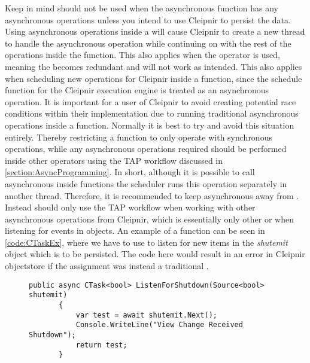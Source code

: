 Keep in mind  should not be used when the asynchronous function has any asynchronous operations unless you intend to use Cleipnir to persist the data. Using asynchronous operations inside a  will cause Cleipnir to create a new thread to handle the asynchronous operation while continuing on with the rest of the operations inside the function. This also applies when the  operator is used, meaning the  becomes redundant and will not work as intended. This also applies when scheduling new operations for Cleipnir inside a  function, since the schedule function for the Cleipnir execution engine is treated as an asynchronous operation. It is important for a user of Cleipnir to avoid creating potential race conditions within their implementation due to running traditional asynchronous operations inside a  function. Normally it is best to try and avoid this situation entirely. Thereby restricting a  function to only operate with synchronous operations, while any asynchronous operations required should be performed inside other  operators using the TAP workflow discussed in \autoref{section:AsyncProgramming}. In short, although it is possible to call asynchronous  inside  functions the scheduler runs this operation separately in another thread. Therefore, it is recommended to keep asynchronous  away from . Instead  should only use the TAP workflow when working with other asynchronous operations from Cleipnir, which is essentially only other  or when listening for events in  objects. An example of a  function can be seen in \autoref{code:CTaskEx}, where we have to use  to listen for new items in the \emph{shutemit}  object which is to be persisted. The code here would result in an error in Cleipnir objectstore if the  assignment was instead a traditional .

\begin{figure}[h]
	\centering
	\begin{lstlisting}[label = code:CTaskEx, caption= Example of a CTask function, captionpos = b, basicstyle=\scriptsize]
	public async CTask<bool> ListenForShutdown(Source<bool> shutemit)
       {
           var test = await shutemit.Next();
           Console.WriteLine("View Change Received Shutdown");
           return test;
       }
	\end{lstlisting}
\end{figure}

